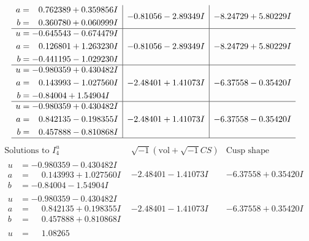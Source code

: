 \documentclass[1p]{elsarticle_modified}
\theoremstyle{definition}
\newcommand{\I}{\sqrt{-1}}
\begin{document}
$$\begin{array}{c|c|c}
\begin{aligned}
a &= \phantom{-}0.762389 + 0.359856 I \\
b &= \phantom{-}0.360780 + 0.060999 I\end{aligned}
 & -0.81056 - 2.89349 I & -8.24729 + 5.80229 I \\ \hline\begin{aligned}
u &= -0.645543 - 0.674479 I \\
a &= \phantom{-}0.126801 + 1.263230 I \\
b &= -0.441195 - 1.029230 I\end{aligned}
 & -0.81056 - 2.89349 I & -8.24729 + 5.80229 I \\ \hline\begin{aligned}
u &= -0.980359 + 0.430482 I \\
a &= \phantom{-}0.143993 - 1.027560 I \\
b &= -0.84004 + 1.54904 I\end{aligned}
 & -2.48401 + 1.41073 I & -6.37558 - 0.35420 I \\ \hline\begin{aligned}
u &= -0.980359 + 0.430482 I \\
a &= \phantom{-}0.842135 - 0.198355 I \\
b &= \phantom{-}0.457888 - 0.810868 I\end{aligned}
 & -2.48401 + 1.41073 I & -6.37558 - 0.35420 I\\
 \hline 
 \end{array}$$\newpage$$\begin{array}{c|c|c}  
\text{Solutions to }I^u_{4}& \I (\text{vol} + \sqrt{-1}CS) & \text{Cusp shape}\\
 \hline 
\begin{aligned}
u &= -0.980359 - 0.430482 I \\
a &= \phantom{-}0.143993 + 1.027560 I \\
b &= -0.84004 - 1.54904 I\end{aligned}
 & -2.48401 - 1.41073 I & -6.37558 + 0.35420 I \\ \hline\begin{aligned}
u &= -0.980359 - 0.430482 I \\
a &= \phantom{-}0.842135 + 0.198355 I \\
b &= \phantom{-}0.457888 + 0.810868 I\end{aligned}
 & -2.48401 - 1.41073 I & -6.37558 + 0.35420 I \\ \hline\begin{aligned}
u &= \phantom{-}1.08265\phantom{ +0.000000I} \\

\end{aligned}
\end{array}$$
\end{document}
